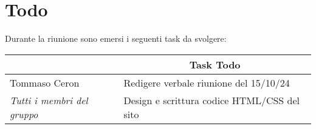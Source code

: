 \section{Todo}

Durante la riunione sono emersi i seguenti task da svolgere:

\vspace{0.5cm}

\begin{table}[htbp]
\begin{tabular}{|p{}|p{}|}
    \hline
    \rowcolor[gray]{0.9}
    \multicolumn{1}{|c|}{\textbf{Assegnatario}} & \multicolumn{1}{|c|}{\textbf{Task Todo}} \\
    \hline
    Tommaso Ceron & Redigere verbale riunione del {15/10/24} \\
    \hline
    \it{Tutti i membri del gruppo} & Design e scrittura codice HTML/CSS del sito\\
    \hline
\end{tabular}
\end{table}
